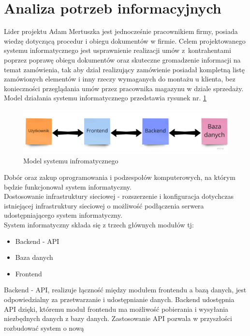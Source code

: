 \documentclass[12pt,a4paper]{article}
\begin{document}
	\section{Analiza potrzeb informacyjnych}
		\indent Lider projektu Adam Mertuszka jest jednocześnie pracownikiem firmy, posiada wiedzę dotyczącą procedur i obiegu dokumentów w firmie. Celem projektowanego systemu
			informatycznego jest usprawnienie realizacji umów z~kontrahentami poprzez poprawę obiegu dokumentów oraz skuteczne gromadzenie informacji na temat zamówienia, tak aby dział
			realizujący zamówienie posiadał kompletną listę zamówionych elementów i inny rzeczy wymaganych do montażu u klienta, bez konieczności
			przeglądania umów przez pracownika magazynu w dziale sprzedaży. Model działania systemu informatycznego przedstawia rysunek nr. \ref{fig:sys_model}\\
			\begin{figure}[H]
			\centering
			\includegraphics[width=\textwidth]{img/model_systemu_informatycznego.jpg}
			\caption{Model systemu infromatycznego}
			\label{fig:sys_model}
		\end{figure}
		\indent Dobór oraz zakup oprogramowania i podzespołów komputerowych, na którym będzie funkcjonował system informatyczny. \\ 
		\indent Dostosowanie infrastruktury sieciowej - rozszerzenie i konfiguracja dotychczas istniejącej infrastruktury sieciowej o możliwość podłączenia serwera udostępniającego
			system informatyczny.\\		
		\indent System informatyczny składa się z trzech głównych modułów tj:
			\begin{itemize}
				\item Backend - API
				\item Baza danych
				\item Frontend
			\end{itemize}
		\indent Backend - API, realizuje łączność między modułem frontendu a bazą danych, jest odpowiedzialny za przetwarzanie i udostępnianie danych. Backend udostępnia API
			dzięki, któremu	moduł frontendu ma możliwość pobierania i wysyłania niezbędnych danych z bazy danych. Zastosowanie API pozwala w przyszłości rozbudować system o nową
\end{document}

